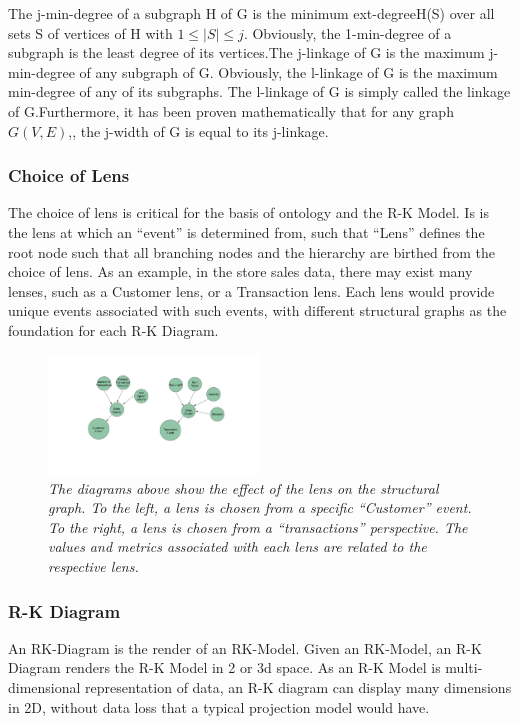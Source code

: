 The j-min-degree of a subgraph H of G is the minimum ext-degreeH(S) over all sets S of vertices of H with $1 \le |S| \le j$. Obviously, the 1-min-degree of a subgraph is the least degree of its vertices.The j-linkage of G is the maximum j-min-degree of any subgraph of G. Obviously, the l-linkage of G is the maximum min-degree of any of its subgraphs. The l-linkage of G is simply called the linkage of G.Furthermore, it has been proven mathematically that for any graph $G(V, E)$,, the j-width of G is equal to its j-linkage.

\subsubsection{Choice of Lens}
\label{sec:sectionlens}

The choice of lens is critical for the basis of ontology and the R-K Model. Is is the lens at which an ``event'' is determined from, such that ``Lens'' defines the root node such that all branching nodes and the hierarchy are birthed from the choice of lens. As an example, in the store sales data, there may exist many lenses, such as a Customer lens, or a Transaction lens. Each lens would provide unique events associated with such events, with different structural graphs as the foundation for each R-K Diagram.

\begin{figure}[H]
	\centering
        \includegraphics[width=0.5\textwidth]{images/lens_choice.png}
	\caption{\textit{The diagrams above show the effect of the lens on the structural graph. To the left, a lens is chosen from a specific ``Customer'' event. To the right, a lens is chosen from a ``transactions'' perspective. The values and metrics associated with each lens are related to the respective lens. }}
	\label{fig:linker}
\end{figure}

\subsubsection{R-K Diagram}

An RK-Diagram is the render of an RK-Model. Given an RK-Model, an R-K Diagram renders the R-K Model in 2 or 3d space. As an R-K Model is multi-dimensional representation of data, an R-K diagram can display many dimensions in 2D, without data loss that a typical projection model would have.

